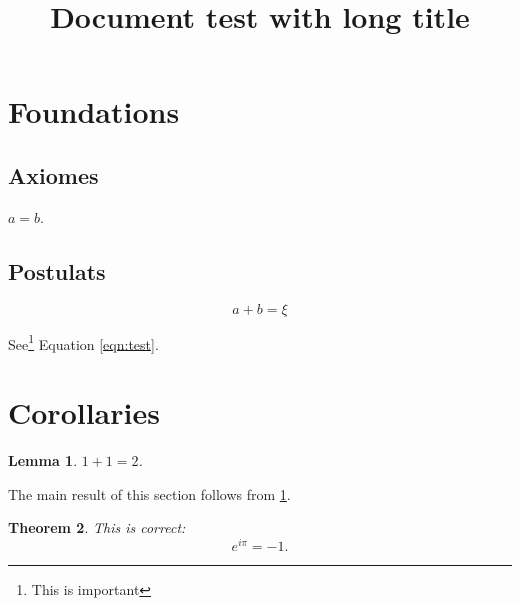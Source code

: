 \documentclass[a4paper]{article}
\title{Document test with long title}
\newtheorem{theorem}{Theorem}
\newtheorem{lem}[theorem]{Lemma}
\begin{document}
\section{Foundations}
\subsection{Axiomes}

$a = b$.

\subsection{Postulats}
\begin{equation}
\label{eqn:test}
a+b = ξ
\end{equation}

See\footnote{This is important} Equation \ref{eqn:test}.

\section{Corollaries}

\begin{lem}
	\label{lem1}
	$1 + 1 = 2$.
\end{lem}

The main result of this section follows from \ref{lem1}.

\begin{theorem}
This is correct:
\[
	e^{i\pi} = -1.
\]
\end{theorem}
\end{document}

